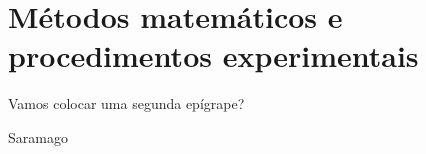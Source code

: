 \chapter{Métodos matemáticos e procedimentos experimentais}

\epigraph{Vamos colocar uma segunda  epígrape?}{Saramago}





